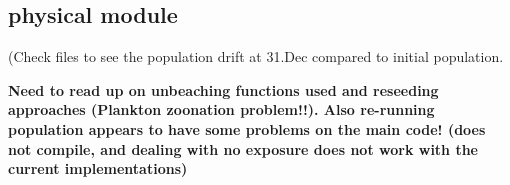








\subsection{physical module}




(Check files to see the population drift at 31.Dec compared to initial population.

\textbf{
Need to read up on unbeaching functions used and reseeding approaches (Plankton zoonation problem!!). Also re-running population appears to have some problems on the main code! (does not compile, and dealing with no exposure does not work with the current implementations)}




